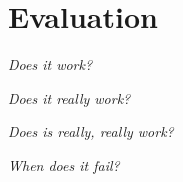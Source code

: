 \section{Evaluation}
\label{sec:eval}

{\em Does it work?}

{\em Does it really work?}

{\em Does is really, really work?}

{\em When does it fail?}

